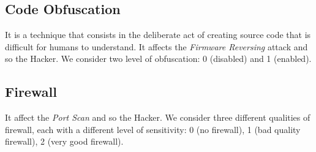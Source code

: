 \subsection*{Code Obfuscation}
It is a technique that consists in the deliberate act of creating source code that is difficult for humans to understand. It affects the \textit{Firmware Reversing} attack and so the Hacker. We consider two level of obfuscation: 0 (disabled) and 1 (enabled).

\subsection*{Firewall}
\noindent It affect the \textit{Port Scan} and so the Hacker. We consider three different qualities of firewall, each with a different level of sensitivity: 0 (no firewall), 1 (bad quality firewall), 2 (very good firewall).